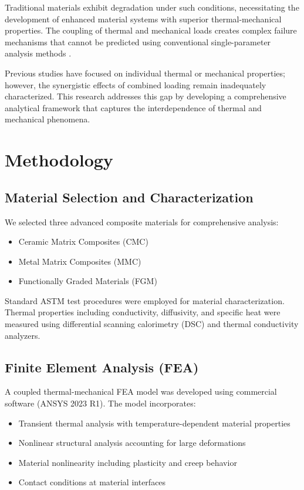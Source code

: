 \documentclass[10pt,conference]{IEEEtran}
\begin{document}
Traditional materials exhibit degradation under such conditions, necessitating the development of enhanced material systems with superior thermal-mechanical properties. The coupling of thermal and mechanical loads creates complex failure mechanisms that cannot be predicted using conventional single-parameter analysis methods \cite{ref2}.

Previous studies have focused on individual thermal or mechanical properties; however, the synergistic effects of combined loading remain inadequately characterized. This research addresses this gap by developing a comprehensive analytical framework that captures the interdependence of thermal and mechanical phenomena.

\section{Methodology}

\subsection{Material Selection and Characterization}

We selected three advanced composite materials for comprehensive analysis:
\begin{itemize}
\item Ceramic Matrix Composites (CMC)
\item Metal Matrix Composites (MMC)
\item Functionally Graded Materials (FGM)
\end{itemize}

Standard ASTM test procedures were employed for material characterization. Thermal properties including conductivity, diffusivity, and specific heat were measured using differential scanning calorimetry (DSC) and thermal conductivity analyzers.

\subsection{Finite Element Analysis (FEA)}

A coupled thermal-mechanical FEA model was developed using commercial software (ANSYS 2023 R1). The model incorporates:
\begin{itemize}
\item Transient thermal analysis with temperature-dependent material properties
\item Nonlinear structural analysis accounting for large deformations
\item Material nonlinearity including plasticity and creep behavior
\item Contact conditions at material interfaces
\end{itemize}
\end{document}
